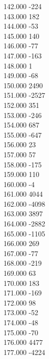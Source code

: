 { 142.000	-224 \\
 143.000	182 \\
 144.000	-53 \\
 145.000	140 \\
 146.000	-77 \\
 147.000	-163 \\
 148.000	1 \\
 149.000	-68 \\
 150.000	2490 \\
 151.000	-2527 \\
 152.000	351 \\
 153.000	-246 \\
 154.000	687 \\
 155.000	-647 \\
 156.000	23 \\
 157.000	57 \\
 158.000	-175 \\
 159.000	110 \\
 160.000	-4 \\
 161.000	4044 \\
 162.000	-4098 \\
 163.000	3897 \\
 164.000	-2882 \\
 165.000	-1105 \\
 166.000	269 \\
 167.000	-77 \\
 168.000	-219 \\
 169.000	63 \\
 170.000	183 \\
 171.000	-169 \\
 172.000	98 \\
 173.000	-52 \\
 174.000	-48 \\
 175.000	-70 \\
 176.000	4477 \\
 177.000	-4224 \\
}
